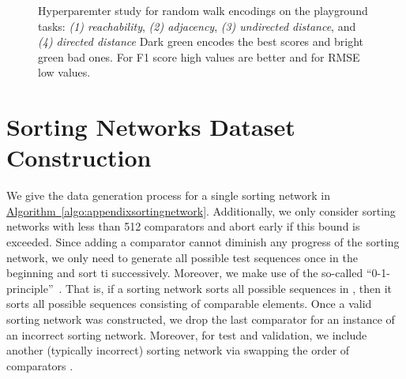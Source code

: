 \documentclass{article}
\begin{document}
\begin{figure}[t]
  \caption{Hyperparemter study for random walk encodings on the playground tasks: \emph{(1) reachability}, \emph{(2) adjacency}, \emph{(3) undirected distance}, and \emph{(4) directed distance} Dark green encodes the best scores and bright green bad ones. For F1 score high values are better and for RMSE low values.}
  \label{fig:appendix_playground_rw}
  \vspace{-0.12in}
\end{figure}


\section{Sorting Networks Dataset Construction}\label{sec:appendix_sorting_networks}

We give the data generation process for a single sorting network in \hyperref[algo:appendixsortingnetwork]{Algorithm~\ref{algo:appendixsortingnetwork}}. Additionally, we only consider sorting networks with less than 512 comparators and abort early if this bound is exceeded. Since adding a comparator cannot diminish any progress of the sorting network, we only need to generate all possible test sequences once in the beginning and sort ti successively. Moreover, we make use of the so-called ``0-1-principle''~\citep{knuth_art_1973}. That is, if a sorting network sorts all possible sequences in , then it sorts all possible sequences consisting of comparable elements. Once a valid sorting network was constructed, we drop the last comparator  for an instance of an incorrect sorting network. Moreover, for test and validation, we include another (typically incorrect) sorting network via swapping the order of comparators .
\end{document}
